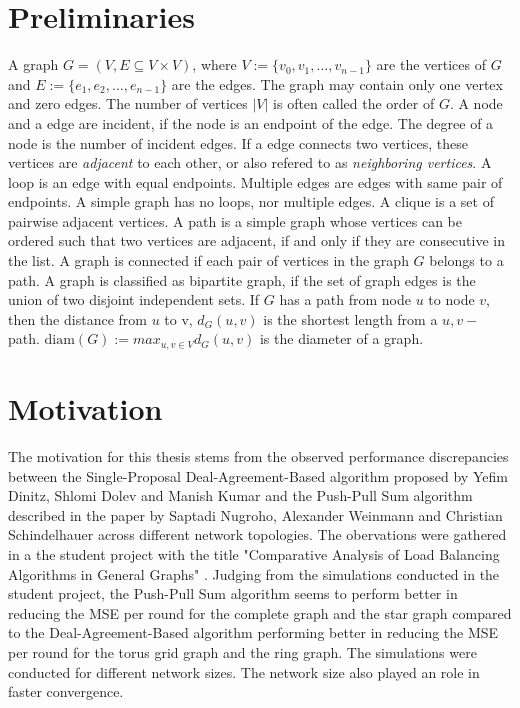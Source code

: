 \section{Preliminaries}\label{sec:prelimn}
A graph $G = (V, E \subseteq V \times V)$, where $V := \{v_0, v_1,..., v_{n-1}\}$ are the vertices of $G$ and $E := \{e_1, e_2,...,e_{n-1}\}$ are the edges. The graph may contain only one vertex and zero edges. The number of vertices $|V|$ is often called the order of $G$. A node and a edge are incident, if the node is an endpoint of the edge. The degree of a node is the number of incident edges. If a edge connects two vertices, these vertices are \textit{adjacent} to each other, or also refered to as \textit{neighboring vertices}. A loop is an edge with equal endpoints. Multiple edges are edges with same pair of endpoints. A simple graph has no loops, nor multiple edges. A clique is a set of pairwise adjacent vertices. A path is a simple graph whose vertices can be ordered such that two vertices are adjacent, if and only if they are consecutive in the list. A graph is connected if each pair of vertices in the graph $G$ belongs to a path. A graph is classified as bipartite graph, if the set of graph edges is the union of two disjoint independent sets. If $G$ has a path from node $u$ to node $v$, then the distance from $u$ to v, $d_G(u,v)$ is the shortest length from a $u,v-$path. $\text{diam} (G) := max_{u,v\in V}d_G(u,v)$ is the diameter of a graph. \cite{GraphTheorySchindelhaauer2021} 

\section{Motivation}\label{sec:motivation}
The motivation for this thesis stems from the observed performance discrepancies between the Single-Proposal Deal-Agreement-Based algorithm proposed by Yefim Dinitz, Shlomi Dolev and Manish Kumar \cite{Dinitz2023DAB} and the Push-Pull Sum algorithm described in the paper by Saptadi Nugroho, Alexander Weinmann and Christian Schindelhauer \cite{nugroho2023PushPullSumDataAg} across different network topologies. The obervations were gathered in a the student project with the title "Comparative Analysis of Load Balancing Algorithms in General Graphs" \cite{Bayazitoglu}. Judging from the simulations conducted in the student project, the Push-Pull Sum algorithm seems to perform better in reducing the MSE per round for the complete graph and the star graph compared to the Deal-Agreement-Based algorithm performing better in reducing the MSE per round for the torus grid graph and the ring graph. The simulations were conducted for different network sizes. The network size also played an role in faster convergence.

